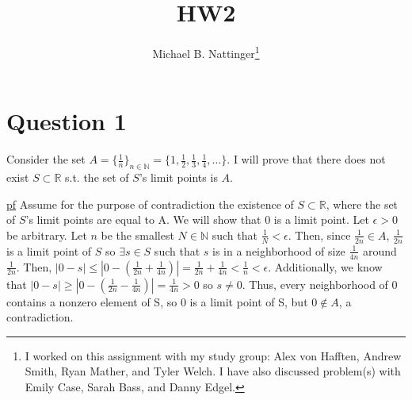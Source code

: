 \documentclass[11pt]{article} %
\title{HW2}
\author{Michael B. Nattinger\footnote{I worked on this assignment with my study group: Alex von Hafften, Andrew Smith, Ryan Mather, and Tyler Welch. I have also discussed problem(s) with Emily Case, Sarah Bass, and Danny Edgel.}}
\begin{document}
\maketitle

\section{Question 1}
Consider the set $A = \{ \frac{1}{n} \}_{n \in \mathbb{N}} = \{1, \frac{1}{2}, \frac{1}{3}, \frac{1}{4}, \dots \}.$ I will prove that there does not exist $S \subset \mathbb{R}$ s.t. the set of $S$'s limit points is $A$.

\underline{pf} Assume for the purpose of contradiction the existence of $S \subset \mathbb{R}$, where the set of $S$'s limit points are equal to A. We will show that 0 is a limit point. Let $\epsilon > 0$ be arbitrary. Let $n$ be the smallest $N \in \mathbb{N}$ such that $\frac{1}{N}< \epsilon.$ Then, since $\frac{1}{2n} \in A$, $\frac{1}{2n}$ is a limit point of $S$ so $\exists s \in S$ such that $s$ is in a neighborhood of size $\frac{1}{4n}$ around $\frac{1}{2n}$. Then, $|0 - s| \leq |0 - \left( \frac{1}{2n} + \frac{1}{4n} \right)| = \frac{1}{2n} + \frac{1}{4n} < \frac{1}{n}< \epsilon$. Additionally, we know that $|0 - s| \geq |0 - \left( \frac{1}{2n} - \frac{1}{4n}\right)| = \frac{1}{4n} > 0$ so $s \neq 0$. Thus, every neighborhood of 0 contains a nonzero element of S, so 0 is a limit point of S, but $0 \notin A$, a contradiction.
%
%
%
\end{document}
